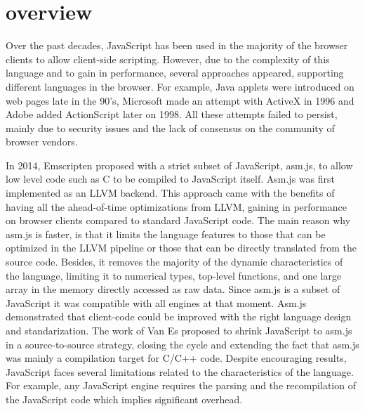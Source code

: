 \section{\wasm overview}
\label{sota:wasm}

\newcommand{\lstnumberautorefname}{Line}
\newcommand{\lineref}[1]{\autoref{#1}}




Over the past decades, JavaScript has been used in the majority of the browser clients to allow client-side scripting. However, due to the complexity of this language and to gain in performance, several approaches appeared, supporting different languages in the browser.  For example, Java applets were introduced on web pages late in the 90's, Microsoft made an attempt with ActiveX in 1996  and Adobe added ActionScript later on 1998. All these attempts failed to persist, mainly due to security issues and the lack of consensus on the community of browser vendors. 

In 2014, Emscripten proposed with a strict subset of JavaScript, asm.js, to allow low level code such as C to be compiled to JavaScript itself. Asm.js was first implemented as an LLVM backend. This approach came with the benefits of having all the ahead-of-time optimizations from LLVM, gaining in performance on browser clients \cite{asmjs} compared to standard JavaScript code. The main reason why asm.js is faster, is that it limits the language features to those that can be optimized in the LLVM pipeline or those that can be directly translated from the source code. Besides, it removes the majority of the dynamic characteristics of the language, limiting it to numerical types, top-level functions, and one large array in the memory directly accessed as raw data. Since asm.js is a subset of JavaScript it was compatible with all engines at that moment. Asm.js demonstrated that client-code could be improved with the right language design and standarization.
The work of Van Es \etal \cite{EsAsm.js} proposed to shrink JavaScript to asm.js in a source-to-source strategy, closing the cycle and extending the fact that asm.js was mainly a compilation target for C/C++ code. Despite encouraging results, JavaScript faces several limitations related to the characteristics of the language. For example, any JavaScript engine requires the parsing and the recompilation of the JavaScript code which implies significant overhead.

